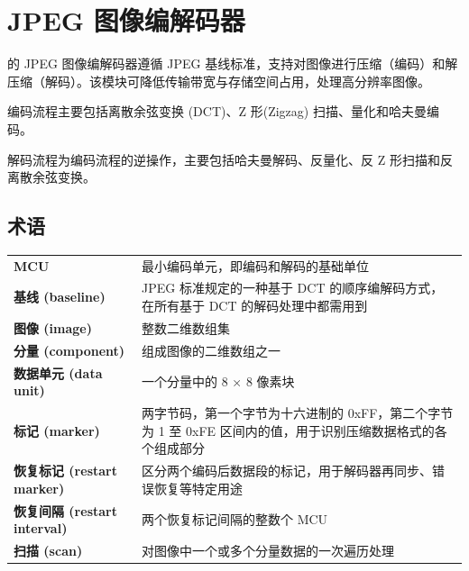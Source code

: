 \documentclass[main\_\_CN.tex]{subfiles}
\begin{document}
\setchineseformatting


\ifglobal
\else
    \clearpage
    \listoftodos
    \listofdonetodos
    \tableofcontents
\fi



\hypertarget{jpegcodec}{}
\chapter{JPEG 图像编解码器}
\label{mod:jpegcodec}



\chipname{} 的 JPEG 图像编解码器遵循 JPEG 基线标准，支持对图像进行压缩（编码）和解压缩（解码）。该模块可降低传输带宽与存储空间占用，处理高分辨率图像。

编码流程主要包括离散余弦变换 (DCT)、Z 形(Zigzag) 扫描、量化和哈夫曼编码。

解码流程为编码流程的逆操作，主要包括哈夫曼解码、反量化、反 Z 形扫描和反离散余弦变换。

\section{术语}
\label{sec:jpegcodec-term}
\begin{longtable}[c]{ R{4cm} p{12cm} }
\textbf{MCU} & 最小编码单元，即编码和解码的基础单位 \\
\textbf{基线 (baseline)} & JPEG 标准规定的一种基于 DCT 的顺序编解码方式，在所有基于 DCT 的解码处理中都需用到 \\
\textbf{图像 (image)} & 整数二维数组集 \\
\textbf{分量 (component)} & 组成图像的二维数组之一 \\
\textbf{数据单元 (data unit)} & 一个分量中的 8 × 8 像素块 \\
\textbf{标记 (marker)} & 两字节码，第一个字节为十六进制的 0xFF，第二个字节为 1 至 0xFE 区间内的值，用于识别压缩数据格式的各个组成部分 \\
\textbf{恢复标记 (restart marker)} & 区分两个编码后数据段的标记，用于解码器再同步、错误恢复等特定用途 \\
\textbf{恢复间隔 (restart interval)} & 两个恢复标记间隔的整数个 MCU  \\
\textbf{扫描 (scan)} & 对图像中一个或多个分量数据的一次遍历处理 \\
\end{longtable}
\end{document}
